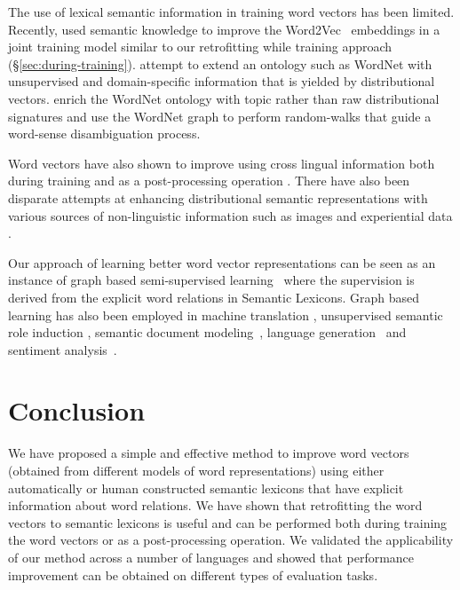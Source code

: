 \documentclass[11pt]{article}
\begin{document}
The use of lexical semantic information in training word vectors has been limited. 
Recently,  used semantic knowledge to improve the 
Word2Vec~\cite{mikolov2013efficient}
embeddings in a joint training model similar to our retrofitting while 
training approach (\S\ref{sec:during-training}). 
 attempt to extend an ontology such as WordNet with unsupervised and 
domain-specific information that is yielded by distributional vectors. 
 enrich the 
WordNet ontology with topic rather than raw distributional signatures and  use the WordNet 
graph to perform random-walks that guide a word-sense disambiguation process.

Word vectors have also shown to improve using cross lingual information both during
training \cite{zou-EtAl:2013:EMNLP,hermann2014multilingual} and as a post-processing operation \cite{faruqui-dyer:2014:EACL2014}.  
There have also been disparate attempts at enhancing distributional semantic representations with various sources of non-linguistic information such as images \cite{bruni:2011} and experiential data \cite{andrews:2009}.

Our approach of learning better word vector representations can be seen as an instance of graph based
semi-supervised learning~\cite{Zhu:2005:SLG:1104523,Talukdar:2010:EGS:1858681.1858830} 
where the supervision is derived from the explicit word relations in Semantic Lexicons. Graph based
learning has also been employed in machine translation \cite{Alexandrescu:2009:GLS:1620754.1620772,saluja:2014:ACL2014},
unsupervised semantic role induction \cite{Lang:2011:USR:2145432.2145571}, 
semantic document modeling~\cite{schuhmacher:2014}, 
language generation~\cite{Krahmer:2003:GGR:778822.778825} and
sentiment analysis~\cite{Goldberg:2006:SSA:1654758.1654769}.

\section{Conclusion}

We have proposed a simple and effective method to improve
word vectors (obtained from different models of word representations)
using either automatically or human constructed semantic lexicons
that have explicit information about word relations. We have shown that
retrofitting the word vectors to semantic lexicons is useful and 
can be performed both during training
the word vectors or as a post-processing operation. We validated the
applicability of our method across a number of languages and showed that 
performance improvement can be obtained on different types of evaluation tasks.



\end{document}
